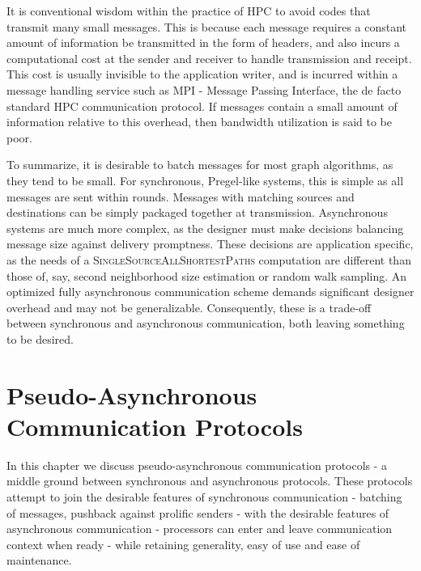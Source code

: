 \documentclass[10]{report}
\newcommand{\algoname}[1]{\textnormal{\textsc{#1}}}
\begin{document}
It is conventional wisdom within the practice of HPC to avoid codes that transmit many small messages.
This is because each message requires a constant amount of information be transmitted in the form of headers, and also incurs a computational cost at the sender and receiver to handle transmission and receipt.
This cost is usually invisible to the application writer, and is incurred within a message handling service such as MPI - Message Passing Interface, the de facto standard HPC communication protocol.
If messages contain a small amount of information relative to this overhead, then bandwidth utilization is said to be poor.

To summarize, it is desirable to batch messages for most graph algorithms, as they tend to be small. 
For synchronous, Pregel-like systems,  this is simple as all messages are sent within rounds. 
Messages with matching sources and destinations can be simply packaged together at transmission.
Asynchronous systems are much more complex, as the designer must make decisions balancing message size against delivery promptness.
These decisions are application specific, as the needs of a \algoname{SingleSourceAllShortestPaths} computation are different than those of, say, second neighborhood size estimation or random walk sampling. 
An optimized fully asynchronous communication scheme demands significant designer overhead and may not be generalizable.
Consequently, these is a trade-off between synchronous and asynchronous communication, both leaving something to be desired.  





\section{Pseudo-Asynchronous Communication Protocols} \label{async:sec:async}

In this chapter we discuss pseudo-asynchronous communication protocols - a middle ground between synchronous and asynchronous protocols.
These protocols attempt to join the desirable features of synchronous communication - batching of messages, pushback against prolific senders - with the desirable features of asynchronous communication - processors can enter and leave communication context when ready - while retaining generality, easy of use and ease of maintenance. 
\end{document}
